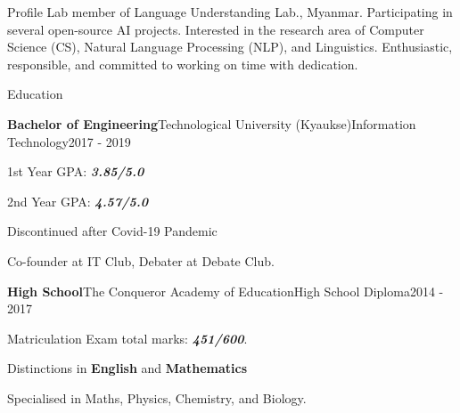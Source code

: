 \documentclass{resume} %
\begin{document}


\begin{rSection}{Profile}
 Lab member of Language Understanding Lab., Myanmar. Participating in several open-source AI projects. Interested in the research area of Computer Science (CS), Natural Language Processing (NLP), and Linguistics. Enthusiastic, responsible, and committed to working on time with dedication.
\end{rSection}
    

\begin{rSection}{Education}
    
    \begin{rSubsectionNoBullet}{\bf Bachelor of Engineering}{Technological University (Kyaukse)}{Information Technology}{2017 - 2019}
        \item{1st Year GPA: \textit{\textbf{3.85/5.0}}}
        \item{2nd Year GPA: \textit{\textbf{\textbf{4.57/5.0}}}}
        \item{Discontinued after Covid-19 Pandemic}
        \item{Co-founder at IT Club, Debater at Debate Club.}
        
    \end{rSubsectionNoBullet}
    
    \begin{rSubsectionNoBullet}{\bf High School}{The Conqueror Academy of Education}{High School Diploma}{2014 - 2017}
        \item{Matriculation Exam total marks: \textit{\textbf{451/600}}.}
        \item{Distinctions in \textbf{English} and \textbf{Mathematics}}
        \item{Specialised in Maths, Physics, Chemistry, and Biology.}
    \end{rSubsectionNoBullet}

\end{rSection}
\end{document}
